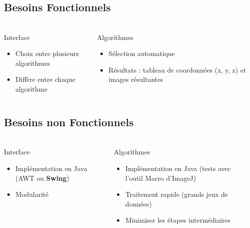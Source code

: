 \documentclass[11pt]{beamer}
\begin{document}
\subsection{Besoins Fonctionnels}
\begin{frame}
\frametitle{\subsecname}
	\begin{columns}[t]
		
		\begin{column}{5cm}
			\begin{block}{Interface}
				\begin{itemize}
					\item Choix entre plusieurs algorithmes
					\item Diffère entre chaque algorithme
				\end{itemize}
			\end{block}
		\end{column}
		\begin{column}{5cm}
			\begin{block}{Algorithmes}
				\begin{itemize}
					\item Sélection automatique
					\item Résultats : tableau de coordonnées (x, y, z) et images résultantes
				\end{itemize}
			\end{block}
		\end{column}
	\end{columns}	
\end{frame}

\subsection{Besoins non Fonctionnels}
\begin{frame}
\frametitle{\subsecname}
	\begin{columns}[t]
		\begin{column}{5cm}
			\begin{block}{Interface}
				\begin{itemize}
					\item Implémentation en Java (AWT ou \textbf{Swing})
					\item Modularité
				\end{itemize}
			\end{block}
		\end{column}
		\begin{column}{5cm}
			\begin{block}{Algorithmes}
				\begin{itemize}
					\item Implémentation en Java (tests avec l'outil Macro d'ImageJ)
					\item Traitement rapide (grands jeux de données)
					\item Minimiser les étapes intermédiaires
				\end{itemize}
			\end{block}
		\end{column}
	\end{columns}
\end{frame}
\end{document}
